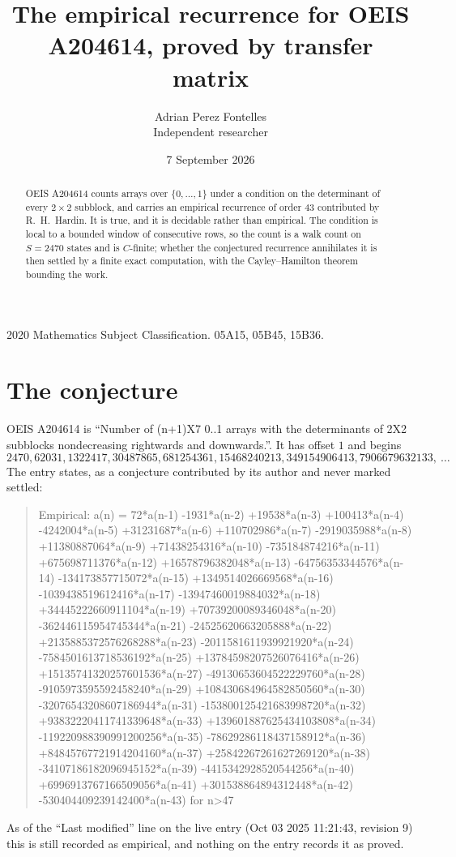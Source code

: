 \documentclass[11pt,a4paper]{article}
\title{The empirical recurrence for OEIS A204614, proved by transfer matrix}
\author{Adrian Perez Fontelles\\ \small Independent researcher}
\date{7 September 2026}
\theoremstyle{plain}
\theoremstyle{definition}
\begin{document}
\maketitle

\begin{abstract}
OEIS A204614 counts arrays over $\{0,\dots,1\}$ under a condition on the determinant of every
$2\times2$ subblock, and carries an empirical recurrence of order $43$ contributed by
R.~H.~Hardin. It is true, and it is decidable rather than empirical. The condition is local to
a bounded window of consecutive rows, so the count is a walk count on $S=2470$ states and is
$C$-finite; whether the conjectured recurrence annihilates it is then settled by a finite exact
computation, with the Cayley--Hamilton theorem bounding the work.
\end{abstract}

\noindent\small 2020 Mathematics Subject Classification. 05A15, 05B45, 15B36.\normalsize

\section{The conjecture}

OEIS A204614 is ``Number of (n+1)X7 0..1 arrays with the determinants of 2X2 subblocks nondecreasing rightwards and downwards.''. It has offset $1$ and begins
\[
2470, 62031, 1322417, 30487865, 681254361, 15468240213, 349154906413, 7906679632133,\ \dots
\]
The entry states, as a conjecture contributed by its author and never marked settled:
\begin{quote}
Empirical: a(n) = 72*a(n-1) -1931*a(n-2) +19538*a(n-3) +100413*a(n-4) -4242004*a(n-5) +31231687*a(n-6) +110702986*a(n-7) -2919035988*a(n-8) +11380887064*a(n-9) +71438254316*a(n-10) -735184874216*a(n-11) +675698711376*a(n-12) +16578796382048*a(n-13) -64756353344576*a(n-14) -134173857715072*a(n-15) +1349514026669568*a(n-16) -1039438519612416*a(n-17) -13947460019884032*a(n-18) +34445222660911104*a(n-19) +70739200089346048*a(n-20) -362446115954745344*a(n-21) -24525620663205888*a(n-22) +2135885372576268288*a(n-23) -2011581611939921920*a(n-24) -7584501613718536192*a(n-25) +13784598207526076416*a(n-26) +15135741320257601536*a(n-27) -49130653604522229760*a(n-28) -9105973595592458240*a(n-29) +108430684964582850560*a(n-30) -32076543208607186944*a(n-31) -153800125421683998720*a(n-32) +93832220411741339648*a(n-33) +139601887625434103808*a(n-34) -119220988390991200256*a(n-35) -78629286118437158912*a(n-36) +84845767721914204160*a(n-37) +25842267261627269120*a(n-38) -34107186182096945152*a(n-39) -4415342928520544256*a(n-40) +6996913767166509056*a(n-41) +301538864894312448*a(n-42) -530404409239142400*a(n-43) for n>47
\end{quote}
As of the ``Last modified'' line on the live entry (Oct 03 2025 11:21:43, revision 9) this is still
recorded as empirical, and nothing on the entry records it as proved.
\end{document}
